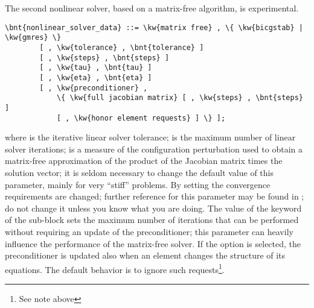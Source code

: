 The second nonlinear solver, based on a
matrix-free algorithm, is experimental.
\begin{Verbatim}[commandchars=\\\{\}]
    \bnt{nonlinear_solver_data} ::= \kw{matrix free} , \{ \kw{bicgstab} | \kw{gmres} \}
        [ , \kw{tolerance} , \bnt{tolerance} ]
        [ , \kw{steps} , \bnt{steps} ]
        [ , \kw{tau} , \bnt{tau} ]
        [ , \kw{eta} , \bnt{eta} ]
        [ , \kw{preconditioner} ,
            \{ \kw{full jacobian matrix} [ , \kw{steps} , \bnt{steps} ] 
	        [ , \kw{honor element requests} ] \} ];
\end{Verbatim}
where  is the iterative linear solver tolerance;
 is the maximum number of linear solver iterations;
 is a measure of the configuration perturbation used
to obtain a matrix-free approximation of the product
of the Jacobian matrix times the solution vector;
it is seldom necessary to change the default value of this parameter,
mainly for very ``stiff'' problems.
By setting  the convergence requirements are changed; 
further reference for this parameter may be found in \cite{KELLEY-1995}; 
do not change it unless you know what you are doing.
The value  of the  keyword 
of the  sub-block 
sets the maximum number of iterations that can be performed 
without requiring an update of the preconditioner; 
this parameter can heavily influence
the performance of the matrix-free solver.
If the option  is selected, the preconditioner
is updated also when an element changes the structure of its equations.
The default behavior is to ignore such requests\footnote{See note above}.



